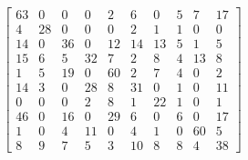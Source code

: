 \documentclass[11pt]{article}
\begin{document}
\begin{equation}
\begin{bmatrix}
63 & 0 & 0 & 0 & 2 & 6 & 0 & 5 & 7 & 17 \\
4 & 28 & 0 & 0 & 0 & 2 & 1 & 1 & 0 & 0 \\
14 & 0 & 36 & 0 & 12 & 14 & 13 & 5 & 1 & 5 \\
15 & 6 & 5 & 32 & 7 & 2 & 8 & 4 & 13 & 8 \\
1 & 5 & 19 & 0 & 60 & 2 & 7 & 4 & 0 & 2 \\
14 & 3 & 0 & 28 & 8 & 31 & 0 & 1 & 0 & 11 \\
0 & 0 & 0 & 2 & 8 & 1 & 22 & 1 & 0 & 1 \\
46 & 0 & 16 & 0 & 29 & 6 & 0 & 6 & 0 & 17 \\
1 & 0 & 4 & 11 & 0 & 4 & 1 & 0 & 60 & 5 \\
8 & 9 & 7 & 5 & 3 & 10 & 8 & 8 & 4 & 38
\end{bmatrix}
\end{equation}
\end{document}
